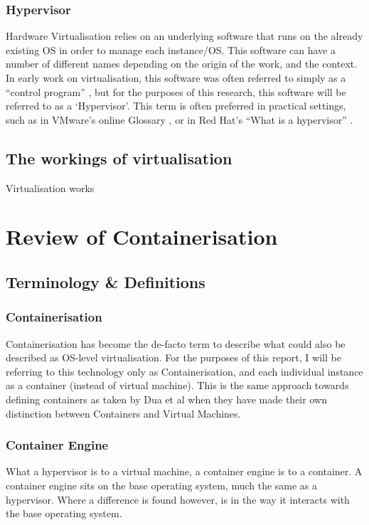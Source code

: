 \subsection{Hypervisor}
\label{subsec:hypervisor}
Hardware Virtualisation relies on an underlying software that runs on the already existing OS in order to manage each instance/OS. This software can have a number of different names depending on the origin of the work, and the context. In early work on virtualisation, this software was often referred to simply as a ``control program'' \citep{creasy1981}, but for the purposes of this research, this software will be referred to as a `Hypervisor'. This term is often preferred in practical settings, such as in VMware's online Glossary \citep{vmwareHypervisor}, or in Red Hat's ``What is a hypervisor'' \citep{redhat2021}.



\section{The workings of virtualisation}
Virtualisation works






\chapter{Review of Containerisation}


\section{Terminology \& Definitions}

\subsection{Containerisation}
\label{subsec:containerisation}
Containerisation has become the de-facto term to describe what could also be described as OS-level virtualisation. For the purposes of this report, I will be referring to this technology only as Containerisation, and each individual instance as a container (instead of virtual machine). This is the same approach towards defining containers as taken by Dua et al \citep{dua14} when they have made their own distinction between Containers and Virtual Machines.

\subsection{Container Engine}
\label{Container Engine}
What a hypervisor is to a virtual machine, a container engine is to a container. A container engine sits on the base operating system, much the same as a hypervisor. Where a difference is found however, is in the way it interacts with the base operating system.

